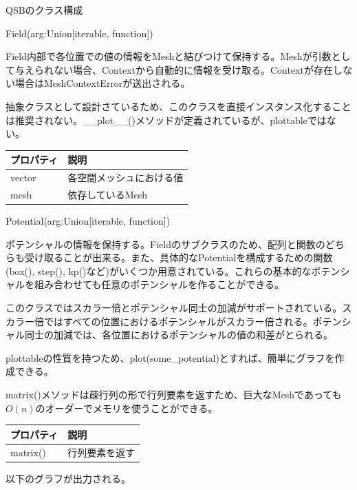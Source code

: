 \documentclass[a4paper, lualatex]{bxjsarticle}
\begin{document}
\begin{section}{QSBのクラス構成}
\begin{subsection}{Field(arg:Union[iterable, function])}
        \par Field内部で各位置での値の情報をMeshと結びつけて保持する。Meshが引数として与えられない場合、Contextから自動的に情報を受け取る。Contextが存在しない場合はMeshContextErrorが送出される。
        \par 抽象クラスとして設計さているため、このクラスを直接インスタンス化することは推奨されない。\_\_plot\_\_()メソッドが定義されているが、plottableではない。
         \begin{table}[h]
            \begin{tabular}{ll}
                プロパティ & 説明\\ \hline
                vector & 各空間メッシュにおける値\\
                mesh & 依存しているMesh
            \end{tabular}
        \end{table}
        
    \end{subsection}
    \begin{subsection}{Potential(arg:Union[iterable, function])}
        \par ポテンシャルの情報を保持する。Fieldのサブクラスのため、配列と関数のどちらも受け取ることが出来る。また、具体的なPotentialを構成するための関数(box(), step(), kp()など)がいくつか用意されている。これらの基本的なポテンシャルを組み合わせても任意のポテンシャルを作ることができる。
        \par このクラスではスカラー倍とポテンシャル同士の加減がサポートされている。スカラー倍ではすべての位置におけるポテンシャルがスカラー倍される。ポテンシャル同士の加減では、各位置におけるポテンシャルの値の和差がとられる。
        \par plottableの性質を持つため、plot(some\_potential)とすれば、簡単にグラフを作成できる。
        \par matrix()メソッドは疎行列の形で行列要素を返すため、巨大なMeshであっても$O(n)$のオーダーでメモリを使うことができる。
        \begin{table}[h]
            \begin{tabular}{ll}
                プロパティ & 説明\\ \hline
                matrix() & 行列要素を返す\\
            \end{tabular}
        \end{table}
        
        以下のグラフが出力される。
        \begin{figure}[h]

\end{figure}
\end{subsection}
\end{section}
\end{document}
